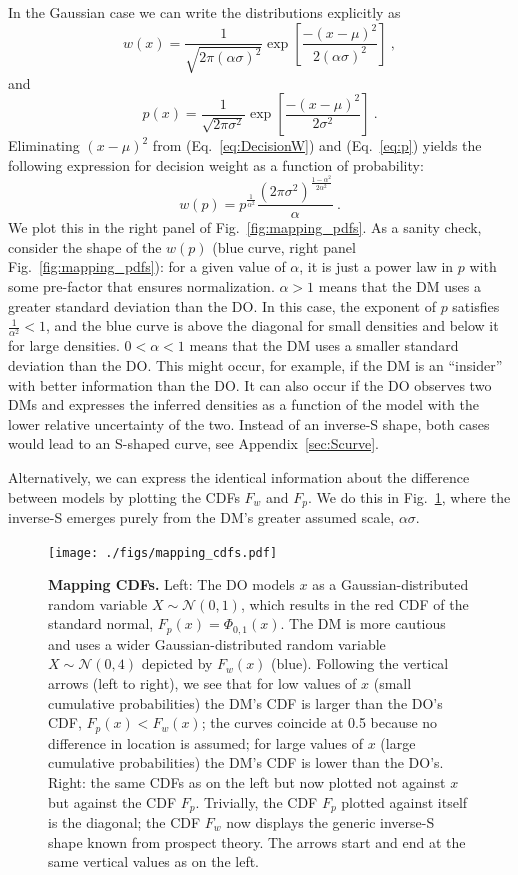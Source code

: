 \documentclass[a4paper, 12pt]{article}
\newcommand{\elabel}[1]{\label{eq:#1}}
\newcommand{\eref}[1]{(Eq.~\ref{eq:#1})}
\newcommand{\flabel}[1]{\label{fig:#1}}
\newcommand{\fref}[1]{Fig.~\ref{fig:#1}}
\newcommand{\Appref}[1]{Appendix~\ref{sec:#1}}
\newcommand{\be}{\begin{equation}}
\newcommand{\ee}{\end{equation}}
\newcommand{\ND}{\mathcal{N}} %
\begin{document}
In the Gaussian case we can write the distributions explicitly as
\be
w(x)=\frac{1}{\sqrt{2\pi (\alpha \sigma)^2}}\exp\left[\frac{-(x -\mu )^2}{2 (\alpha \sigma)^2}\right]~,
\elabel{DecisionW}
\ee
and
\be
p(x)=\frac{1}{\sqrt{2\pi \sigma^2}}\exp\left[\frac{-(x -\mu )^2}{2 \sigma^2}\right] ~.
\elabel{p}
\ee
Eliminating $(x-\mu)^2$ from \eref{DecisionW} and \eref{p} yields the following expression for decision weight as a function of probability:
\be
w(p)= p^{\frac{1}{\alpha^2}} \frac{\left(2\pi\sigma^2\right)^{\frac{1-\alpha^2}{2\alpha^2}}}{\alpha} ~.
\elabel{w_of_p}
\ee
We plot this in the right panel of \fref{mapping_pdfs}. As a sanity check, consider the shape of the $w(p)$ (blue curve, right panel \fref{mapping_pdfs}): for a given value of $\alpha$, it is just a power law in $p$ with some pre-factor that ensures normalization. $\alpha>1$ means that the DM uses a greater standard deviation than the DO. In this case, the exponent of $p$ satisfies $\frac{1}{\alpha^2}<1$, and the blue curve is above the diagonal for small densities and below it for large densities. $0<\alpha<1$ means that the DM uses a smaller standard deviation than the DO.
This might occur, for example, if the DM is an ``insider'' with better information than the DO.
It can also occur if the DO observes two DMs and expresses the inferred densities as a function of the model with the lower relative uncertainty of the two.
Instead of an inverse-S shape, both cases would lead to an S-shaped curve, see \Appref{Scurve}.

Alternatively, we can express the identical information about the difference between models by plotting the CDFs $F_w$ and $F_p$. We do this in \fref{mapping_cdfs}, where the inverse-S emerges purely from the DM's greater assumed scale, $\alpha \sigma$.
\begin{figure}[!htb]
\centering
\texttt{[image: ./figs/mapping\_cdfs.pdf]}
\caption{\textbf{Mapping CDFs.}
Left: The DO models $x$ as a Gaussian-distributed random variable $X \sim \ND(0,1)$, which results in the red CDF of the standard normal, $F_p(x) = \Phi_{0,1}(x)$. The DM is more cautious and uses a wider Gaussian-distributed random variable $X \sim \ND(0,4)$ depicted by $F_w(x)$ (blue).
%
Following the vertical arrows (left to right), we see that for low values of $x$ (small cumulative probabilities) the DM's CDF is larger than the DO's CDF, $F_p(x) < F_w(x)$; the curves coincide at 0.5 because no difference in location is assumed; for large values of $x$ (large cumulative probabilities) the DM's CDF is lower than the DO's.
Right: the same CDFs as on the left but now plotted not against $x$ but against the CDF $F_p$. Trivially, the CDF $F_p$ plotted against itself is the diagonal; the CDF $F_w$ now displays the generic inverse-S shape known from prospect theory. The arrows start and end at the same vertical values as on the left.
}
\flabel{mapping_cdfs}
\end{figure}
\end{document}
